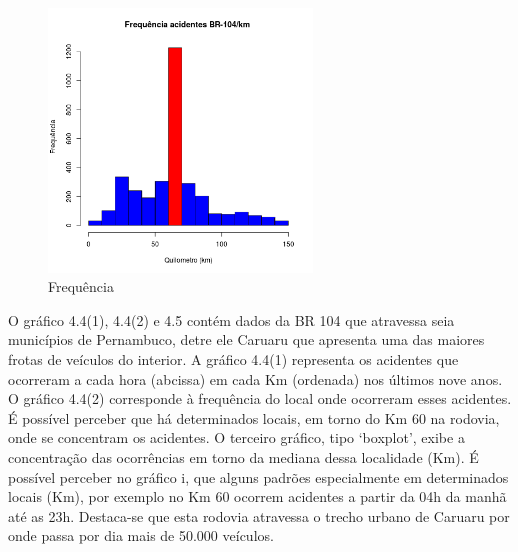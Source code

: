 \quad \quad
\begin{figure}[h]
	\centering
	\caption{ Frequência}
	\includegraphics[width=7cm,height=7cm]{Figuras/Preprocess/br104_3.png}
\end{figure}

O gráfico 4.4(1), 4.4(2)  e 4.5 contém dados da BR 104 que atravessa seia municípios de Pernambuco, detre ele Caruaru que apresenta uma das maiores frotas de veículos do interior. 
A gráfico 4.4(1) representa os acidentes que ocorreram a cada hora (abcissa) em cada Km (ordenada) nos últimos nove anos.
O  gráfico 4.4(2) corresponde à frequência do local onde ocorreram esses acidentes. 
É possível perceber que há determinados locais, em torno do Km 60 na rodovia, onde se concentram os acidentes. 
O terceiro gráfico, tipo ‘boxplot’, exibe a concentração das ocorrências em torno da mediana dessa localidade (Km). 
É possível perceber no gráfico i, que alguns padrões especialmente em determinados locais (Km), por exemplo no Km 60 ocorrem acidentes a partir da 04h da manhã até as 23h. 
Destaca-se que esta rodovia atravessa o trecho urbano de Caruaru por onde  passa por dia mais de 50.000 veículos.


\pagebreak


